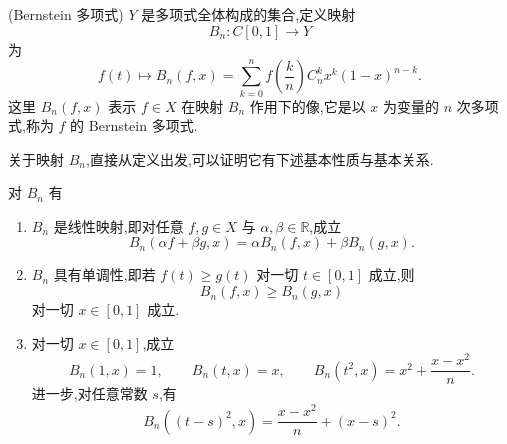 \begin{definition}(Bernstein 多项式)
	$Y$ 是多项式全体构成的集合,定义映射
	\[
	B_n:C[0,1]\longrightarrow Y
	\]
	为
	\[
	f(t)\longmapsto B_n(f,x)=\sum_{k=0}^{n} f\left(\frac{k}{n}\right) C_n^k x^k(1-x)^{n-k}.
	\]
	这里 $B_n(f,x)$ 表示 $f\in X$ 在映射 $B_n$ 作用下的像,它是以 $x$ 为变量的 $n$ 次多项式,称为 $f$ 的 Bernstein 多项式.
\end{definition}

关于映射 $B_n$,直接从定义出发,可以证明它有下述基本性质与基本关系.

对 $B_n$ 有
\begin{enumerate}
	\item $B_n$ 是线性映射,即对任意 $f,g\in X$ 与 $\alpha,\beta\in\mathbb{R}$,成立
	\[
	B_n(\alpha f+\beta g,x)=\alpha B_n(f,x)+\beta B_n(g,x).
	\]
	\item $B_n$ 具有单调性,即若 $f(t)\geqslant g(t)$ 对一切 $t\in[0,1]$ 成立,则
	\[
	B_n(f,x)\geqslant B_n(g,x)
	\]
	对一切 $x\in[0,1]$ 成立.
	\item 对一切 $x\in[0,1]$,成立
	\[
	B_n(1,x)=1,\qquad B_n(t,x)=x,\qquad B_n(t^2,x)=x^2+\frac{x-x^2}{n}.
	\]
	进一步,对任意常数 $s$,有
	\[
	B_n((t-s)^2,x)=\frac{x-x^2}{n}+(x-s)^2.
	\]
\end{enumerate}



